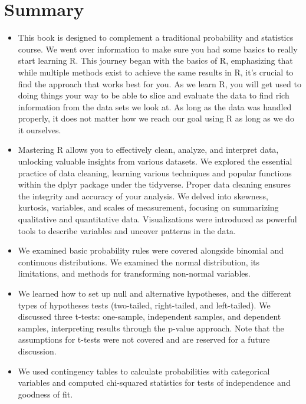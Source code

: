 \documentclass[
  letterpaper,
  DIV=11,
  numbers=noendperiod]{scrreprt}
\providecommand{\tightlist}{%
  \setlength{\itemsep}{0pt}\setlength{\parskip}{0pt}}\usepackage{longtable,booktabs,array}
\begin{document}

\chapter{Summary}\label{summary-11}

\begin{itemize}
\tightlist
\item
  This book is designed to complement a traditional probability and
  statistics course. We went over information to make sure you had some
  basics to really start learning R. This journey began with the basics
  of R, emphasizing that while multiple methods exist to achieve the
  same results in R, it's crucial to find the approach that works best
  for you. As we learn R, you will get used to doing things your way to
  be able to slice and evaluate the data to find rich information from
  the data sets we look at. As long as the data was handled properly, it
  does not matter how we reach our goal using R as long as we do it
  ourselves.
\item
  Mastering R allows you to effectively clean, analyze, and interpret
  data, unlocking valuable insights from various datasets. We explored
  the essential practice of data cleaning, learning various techniques
  and popular functions within the dplyr package under the tidyverse.
  Proper data cleaning ensures the integrity and accuracy of your
  analysis. We delved into skewness, kurtosis, variables, and scales of
  measurement, focusing on summarizing qualitative and quantitative
  data. Visualizations were introduced as powerful tools to describe
  variables and uncover patterns in the data.
\item
  We examined basic probability rules were covered alongside binomial
  and continuous distributions. We examined the normal distribution, its
  limitations, and methods for transforming non-normal variables.
\item
  We learned how to set up null and alternative hypotheses, and the
  different types of hypotheses tests (two-tailed, right-tailed, and
  left-tailed). We discussed three t-tests: one-sample, independent
  samples, and dependent samples, interpreting results through the
  p-value approach. Note that the assumptions for t-tests were not
  covered and are reserved for a future discussion.
\item
  We used contingency tables to calculate probabilities with categorical
  variables and computed chi-squared statistics for tests of
  independence and goodness of fit.

\end{itemize}
\end{document}
